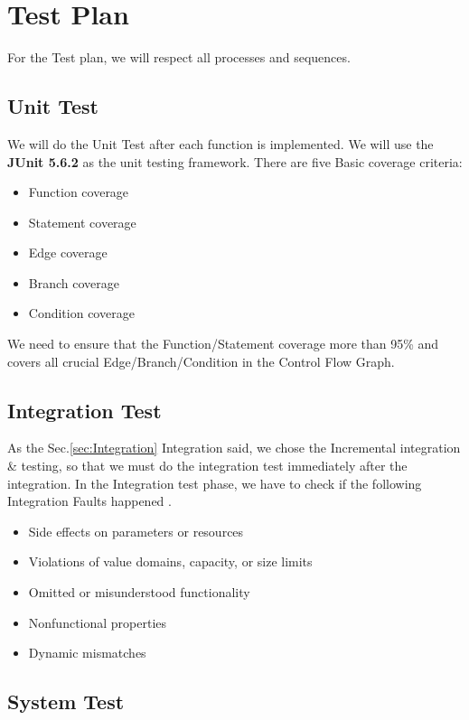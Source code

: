 \documentclass[a4paper,12pt]{report}
\begin{document}
\section{Test Plan}

For the Test plan, we will respect all processes and sequences.

\subsection{Unit Test}
We will do the Unit Test after each function is implemented.
We will use the \textbf{JUnit 5.6.2} as the unit testing framework.
There are five Basic coverage criteria:
\begin{itemize}
	\item Function coverage
	\item Statement coverage
	\item Edge coverage
	\item Branch coverage
	\item Condition coverage
\end{itemize}
We need to ensure that the Function/Statement coverage more than 95\% and covers all crucial Edge/Branch/Condition in the Control Flow Graph.


\subsection{Integration Test}

As the Sec.\ref{sec:Integration} Integration said, we chose the Incremental integration \& testing, so that we must do the integration test immediately after the integration.
In the Integration test phase, we have to check if the following Integration Faults happened \cite{SlidesSE2}.
\begin{itemize}
	\item Side effects on parameters or resources
	\item Violations of value domains, capacity, or size limits
	\item Omitted or misunderstood functionality
	\item Nonfunctional properties
	\item Dynamic mismatches
\end{itemize}


\subsection{System Test}
\end{document}
